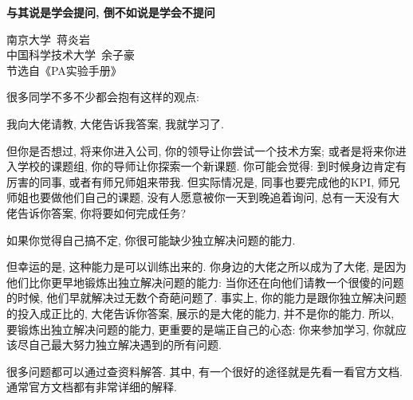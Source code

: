 \begin{pas}
	\begin{center}
		\large \textbf{与其说是学会提问, 倒不如说是学会不提问}
		
	\end{center}
	\begin{center}
		南京大学~蒋炎岩\\
		中国科学技术大学~余子豪\\
		节选自《PA实验手册》
	\end{center}
	
	很多同学不多不少都会抱有这样的观点:

我向大佬请教, 大佬告诉我答案, 我就学习了.

但你是否想过, 将来你进入公司, 你的领导让你尝试一个技术方案; 或者是将来你进入学校的课题组, 你的导师让你探索一个新课题. 你可能会觉得: 到时候身边肯定有厉害的同事, 或者有师兄师姐来带我. 但实际情况是, 同事也要完成他的KPI, 师兄师姐也要做他们自己的课题, 没有人愿意被你一天到晚追着询问, 总有一天没有大佬告诉你答案, 你将要如何完成任务?

如果你觉得自己搞不定, 你很可能缺少独立解决问题的能力.

但幸运的是, 这种能力是可以训练出来的. 你身边的大佬之所以成为了大佬, 是因为他们比你更早地锻炼出独立解决问题的能力: 当你还在向他们请教一个很傻的问题的时候, 他们早就解决过无数个奇葩问题了. 事实上, 你的能力是跟你独立解决问题的投入成正比的, 大佬告诉你答案, 展示的是大佬的能力, 并不是你的能力. 所以, 要锻炼出独立解决问题的能力, 更重要的是端正自己的心态: 你来参加学习, 你就应该尽自己最大努力独立解决遇到的所有问题. 

\end{pas}


很多问题都可以通过查资料解答. 其中, 有一个很好的途径就是先看一看官方文档. 通常官方文档都有非常详细的解释. 






























